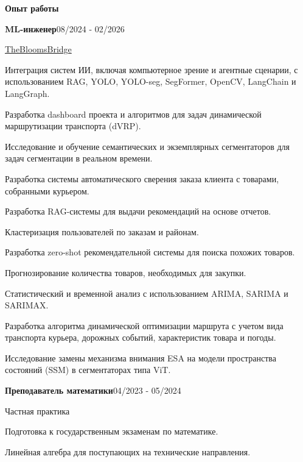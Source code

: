 \documentclass[10pt,a4paper]{article}
\newlength{\mainwidth}\setlength{\mainwidth}{0.66\paperwidth}
\newlength{\mainpad}\setlength{\mainpad}{0.75cm}
\newcommand{\mainheading}[1]{%
  \vspace{8pt}%
  {\color{sidebar}\bfseries\Large #1}\par
  \vspace{-5pt}{\color{accent}\rule{\linewidth}{1.6pt}}\par\vspace{5pt}}
\newcommand{\entry}[3]{%
  {\bfseries #1}\hfill{\color{accent}\small #3}\par
  {\color{accent}\small #2}\par\vspace{2pt}}
\begin{document}
\begin{minipage}[t]{\mainwidth}
\begin{minipage}[t]{\dimexpr\linewidth-1.5\mainpad\relax}
    \mainheading{Опыт работы}
    \entry{ML-инженер}{\href{https://thebloomsbridge.io}{TheBloomsBridge}}{08/2024 - 02/2026}
    \begin{cvbullets}
      \item Интеграция систем ИИ, включая компьютерное зрение и агентные сценарии, с использованием RAG, YOLO, YOLO-seg, SegFormer, OpenCV, LangChain и LangGraph.
      \item Разработка dashboard проекта и алгоритмов для задач динамической маршрутизации транспорта (dVRP).
      \item Исследование и обучение семантических и экземплярных сегментаторов для задач сегментации в реальном времени.
      \item Разработка системы автоматического сверения заказа клиента с товарами, собранными курьером.
      \item Разработка RAG-системы для выдачи рекомендаций на основе отчетов.
      \item Кластеризация пользователей по заказам и районам.
      \item Разработка zero-shot рекомендательной системы для поиска похожих товаров.
      \item Прогнозирование количества товаров, необходимых для закупки.
      \item Статистический и временной анализ с использованием ARIMA, SARIMA и SARIMAX.
      \item Разработка алгоритма динамической оптимизации маршрута с учетом вида транспорта курьера, дорожных событий, характеристик товара и погоды.
      \item Исследование замены механизма внимания ESA на модели пространства состояний (SSM) в сегментаторах типа ViT.
    \end{cvbullets}
    \vspace{3pt}
    \entry{Преподаватель математики}{Частная практика}{04/2023 - 05/2024}
    \begin{cvbullets}
      \item Подготовка к государственным экзаменам по математике.
      \item Линейная алгебра для поступающих на технические направления.
    \end{cvbullets}


\end{minipage}
\end{minipage}
\end{document}
